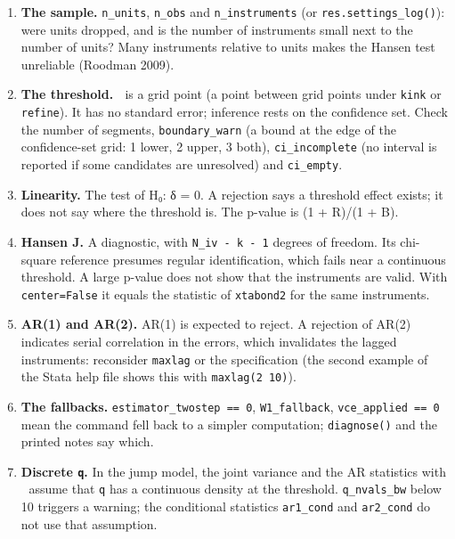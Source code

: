 \documentclass[
  10.5pt,
  a4paper,
]{article}
\providecommand{\tightlist}{%
  \setlength{\itemsep}{0pt}\setlength{\parskip}{0pt}}
\begin{document}
\begin{enumerate}
\def\labelenumi{\arabic{enumi}.}
\tightlist
\item
  \textbf{The sample.} \texttt{n\_units}, \texttt{n\_obs} and
  \texttt{n\_instruments} (or \texttt{res.settings\_log()}): were units
  dropped, and is the number of instruments small next to the number of
  units? Many instruments relative to units makes the Hansen test
  unreliable (Roodman 2009).
\item
  \textbf{The threshold.}  is a grid point (a point between grid points
  under \texttt{kink} or \texttt{refine}). It has no standard error;
  inference rests on the confidence set. Check the number of segments,
  \texttt{boundary\_warn} (a bound at the edge of the confidence-set
  grid: 1 lower, 2 upper, 3 both), \texttt{ci\_incomplete} (no interval
  is reported if some candidates are unresolved) and \texttt{ci\_empty}.
\item
  \textbf{Linearity.} The test of H₀: δ = 0. A rejection says a
  threshold effect exists; it does not say where the threshold is. The
  p-value is (1 + R)/(1 + B).
\item
  \textbf{Hansen J.} A diagnostic, with \texttt{N\_iv\ -\ k\ -\ 1}
  degrees of freedom. Its chi-square reference presumes regular
  identification, which fails near a continuous threshold. A large
  p-value does not show that the instruments are valid. With
  \texttt{center=False} it equals the statistic of \texttt{xtabond2} for
  the same instruments.
\item
  \textbf{AR(1) and AR(2).} AR(1) is expected to reject. A rejection of
  AR(2) indicates serial correlation in the errors, which invalidates
  the lagged instruments: reconsider \texttt{maxlag} or the
  specification (the second example of the Stata help file shows this
  with \texttt{maxlag(2\ 10)}).
\item
  \textbf{The fallbacks.} \texttt{estimator\_twostep\ ==\ 0},
  \texttt{W1\_fallback}, \texttt{vce\_applied\ ==\ 0} mean the command
  fell back to a simpler computation; \texttt{diagnose()} and the
  printed notes say which.
\item
  \textbf{Discrete \texttt{q}.} In the jump model, the joint variance
  and the AR statistics with  assume that \texttt{q} has a continuous
  density at the threshold. \texttt{q\_nvals\_bw} below 10 triggers a
  warning; the conditional statistics \texttt{ar1\_cond} and
  \texttt{ar2\_cond} do not use that assumption.
\end{enumerate}
\end{document}
